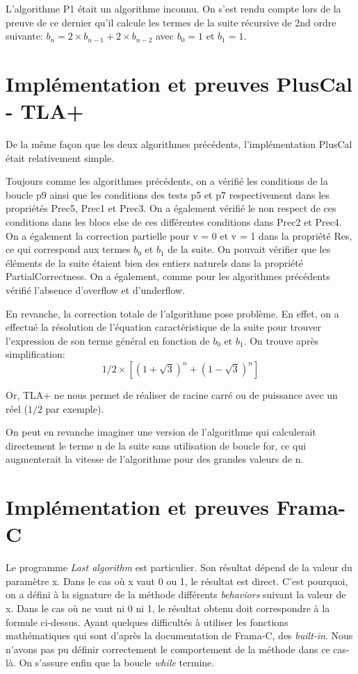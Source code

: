 \documentclass[a4paper,11pt, oneside]{book}
\begin{document}
		L'algorithme P1 était un algorithme inconnu. On s'est rendu compte lors de la
		preuve de ce dernier qu'il calcule les termes de la suite récursive de 2nd
		ordre suivante: $b_n = 2 \times b_{n-1} + 2 \times b_{n-2}$ avec $b_0 = 1$ et $b_1 = 1$.

		\section{Implémentation et preuves PlusCal - TLA+}

		De la même façon que les deux algorithmes précédents, l'implémentation PlusCal
		était relativement simple.

		Toujours comme les algorithmes précédents, on a vérifié les conditions de la boucle
		p9 ainsi que les conditions des tests p5 et p7 respectivement dans les propriétés
		Prec5, Prec1 et Prec3. On a également vérifié le non respect de ces conditions
		dans les blocs else de ces différentes conditions dans Prec2 et Prec4. On a
		également la correction partielle pour v = 0 et v = 1 dans la propriété Res,
		ce qui correspond aux termes $b_0$ et $b_1$ de la suite. On pouvait vérifier
		que les éléments de la suite étaient bien des entiers naturels dans la propriété
		PartialCorrectness. On a également, comme pour les algorithmes précédents vérifié
		l'absence d'overflow et d'underflow.

		En revanche, la correction totale de l'algorithme pose problème. En effet,
		on a effectué la résolution de l'équation caractéristique de la suite pour trouver
		l'expression de son terme général en fonction de $b_0$ et $b_1$.
		On trouve après simplification:
		$$1/2 \times [(1 + \sqrt 3)^n + (1 - \sqrt 3)^n]$$

		Or, TLA+ ne nous permet de réaliser de racine carré ou de puissance avec
		un réel ($1/2$ par exemple).

		On peut en revanche imaginer une version de l'algorithme qui calculerait
		directement le terme n de la suite sans utilisation de boucle for, ce qui
		augmenterait la vitesse de l'algorithme pour des grandes valeurs de n.


		\section{Implémentation et preuves Frama-C}

		Le programme \textit{Last algorithm} est particulier. Son résultat dépend de la valeur du paramètre x.
		Dans le cas où x vaut 0 ou 1, le résultat est direct. C'est pourquoi, on a défini à la signature
		de la méthode différents \textit{behaviors} suivant la valeur de x. Dans le cas où ne vaut
		ni 0 ni 1, le résultat obtenu doit correspondre à la formule ci-dessus. Ayant quelques
		difficultés à utiliser les fonctions mathématiques qui sont d'après la documentation de Frama-C,
		des \textit{built-in}. Nous n'avons pas pu définir correctement le comportement de la méthode dans ce cas-là.
		On s'assure enfin que la boucle \textit{while} termine.
\end{document}
